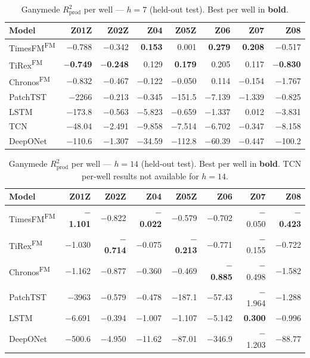 \documentclass[11pt]{article}
\newcommand{\best}[1]{\textbf{#1}}
\newcommand{\fm}{\textsuperscript{FM}}
\newcommand{\rp}{R^2_\text{prod}}
\begin{document}
\begin{table}[ht]
\centering
\caption{Ganymede $\rp$ per well — $h{=}7$ (held-out test). Best per well in \textbf{bold}.}
\label{tab:perwell_r2p_h7}
\scriptsize
\setlength{\tabcolsep}{2.5pt}
\begin{tabular}{@{}l rrrrrrr @{}}
\toprule
\textbf{Model} & \textbf{Z01Z} & \textbf{Z02Z} & \textbf{Z04} & \textbf{Z05Z} & \textbf{Z06} & \textbf{Z07} & \textbf{Z08} \\
\midrule
TimesFM\fm  & $-$0.788 & $-$0.342 & \best{0.153} & 0.001 & \best{0.279} & \best{0.208} & $-$0.517 \\
TiRex\fm    & \best{$-$0.749} & \best{$-$0.248} & 0.129 & \best{0.179} & 0.205 & 0.117 & \best{$-$0.830} \\
Chronos\fm  & $-$0.832 & $-$0.467 & $-$0.122 & $-$0.050 & 0.114 & $-$0.154 & $-$1.767 \\
PatchTST    & $-$2266 & $-$0.213 & $-$0.345 & $-$151.5 & $-$7.139 & $-$1.339 & $-$0.825 \\
LSTM        & $-$173.8 & $-$0.563 & $-$5.823 & $-$0.659 & $-$1.337 & 0.012 & $-$3.831 \\
TCN         & $-$48.04 & $-$2.491 & $-$9.858 & $-$7.514 & $-$6.702 & $-$0.347 & $-$8.158 \\
DeepONet    & $-$110.6 & $-$1.307 & $-$34.59 & $-$112.8 & $-$60.39 & $-$0.447 & $-$100.2 \\
\bottomrule
\end{tabular}
\end{table}

\begin{table}[ht]
\centering
\caption{Ganymede $\rp$ per well — $h{=}14$ (held-out test). Best per well in \textbf{bold}.
TCN per-well results not available for $h{=}14$.}
\label{tab:perwell_r2p_h14}
\scriptsize
\setlength{\tabcolsep}{2.5pt}
\begin{tabular}{@{}l rrrrrrr @{}}
\toprule
\textbf{Model} & \textbf{Z01Z} & \textbf{Z02Z} & \textbf{Z04} & \textbf{Z05Z} & \textbf{Z06} & \textbf{Z07} & \textbf{Z08} \\
\midrule
TimesFM\fm  & \best{$-$1.101} & $-$0.822 & \best{$-$0.022} & $-$0.579 & $-$0.702 & $-$0.050 & \best{$-$0.423} \\
TiRex\fm    & $-$1.030 & \best{$-$0.714} & $-$0.075 & \best{$-$0.213} & $-$0.771 & $-$0.155 & $-$0.722 \\
Chronos\fm  & $-$1.162 & $-$0.877 & $-$0.360 & $-$0.469 & \best{$-$0.885} & $-$0.498 & $-$1.582 \\
PatchTST    & $-$3963 & $-$0.579 & $-$0.478 & $-$187.1 & $-$57.43 & $-$1.964 & $-$1.288 \\
LSTM        & $-$6.691 & $-$0.394 & $-$1.007 & $-$1.107 & $-$5.142 & \best{0.300} & $-$0.996 \\
DeepONet    & $-$500.6 & $-$4.950 & $-$11.62 & $-$87.01 & $-$346.9 & $-$1.203 & $-$88.77 \\
\bottomrule
\end{tabular}
\end{table}
\end{document}
